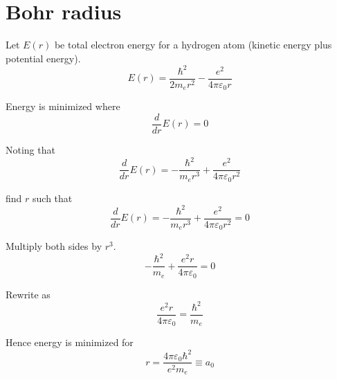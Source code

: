 

\section*{Bohr radius}

Let $E(r)$ be total electron energy for a hydrogen atom (kinetic energy plus potential energy).
\begin{equation*}
E(r)=\frac{\hbar^2}{2m_er^2}-\frac{e^2}{4\pi\varepsilon_0r}
\end{equation*}

Energy is minimized where
\begin{equation*}
\frac{d}{dr}E(r)=0
\end{equation*}

Noting that
\begin{equation*}
\frac{d}{dr}E(r)=-\frac{\hbar^2}{m_er^3}+\frac{e^2}{4\pi\varepsilon_0r^2}
\end{equation*}

find $r$ such that
\begin{equation*}
\frac{d}{dr}E(r)=-\frac{\hbar^2}{m_er^3}+\frac{e^2}{4\pi\varepsilon_0r^2}=0
\end{equation*}

Multiply both sides by $r^3$.
\begin{equation*}
-\frac{\hbar^2}{m_e}+\frac{e^2r}{4\pi\varepsilon_0}=0
\end{equation*}

Rewrite as
\begin{equation*}
\frac{e^2r}{4\pi\varepsilon_0}=\frac{\hbar^2}{m_e}
\end{equation*}

Hence energy is minimized for
\begin{equation*}
r=\frac{4\pi\varepsilon_0\hbar^2}{e^2m_e}\equiv a_0
\end{equation*}


